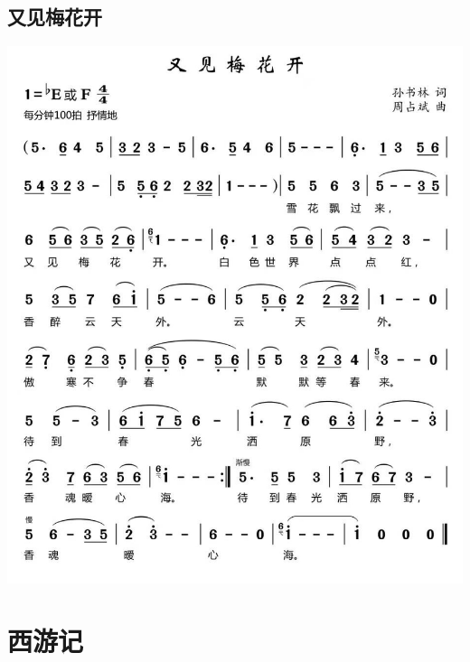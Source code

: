 \documentclass[cn,pad,twocol]{elegantbook}
\begin{document}
\section{又见梅花开} \includegraphics[width=\textwidth]{macos/20210208又见梅花开.jpg}

\chapter{西游记}
\end{document}
